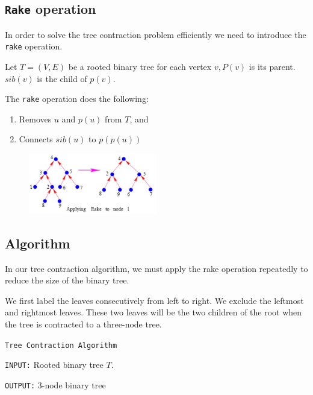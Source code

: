 \documentclass[twoside]{article}
\begin{document}

\subsection{\texttt{Rake} operation}

In order to solve the tree contraction problem efficiently we need to introduce the \texttt{rake} operation.

Let $T=(V,E)$ be a rooted binary tree for each vertex $v, P(v)$ is its parent.  $sib(v)$ is the child of $p(v)$.

The \texttt{rake} operation does the following:
\begin{enumerate}
  \item Removes $u$ and $p(u)$ from $T$, and
  \item Connects $sib(u)$ to $p(p(u))$
\end{enumerate}

\begin{figure}[h]
  \begin{center}
    \includegraphics[width=0.5\textwidth]{rake.jpg}
  \end{center}
\end{figure}

\newpage
\subsection{Algorithm} 

In our tree contraction algorithm, we must apply the rake operation repeatedly to reduce the size of the binary tree.

We first label the leaves consecutively from left to right.  We exclude the leftmost and rightmost leaves.  These two leaves will be the two children of the root when the tree is contracted to a three-node tree.

\vspace{10pt}

\texttt{Tree Contraction Algorithm}

\hspace{10pt} \texttt{INPUT:} Rooted binary tree $T$.

\hspace{10pt} \texttt{OUTPUT:} 3-node binary tree
\end{document}
